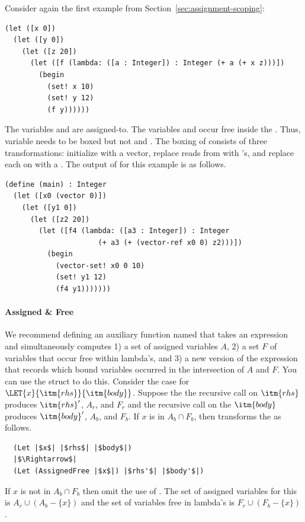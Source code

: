 \documentclass[7x10]{TimesAPriori_MIT}%
\begin{document}
Consider again the first example from
Section~\ref{sec:assignment-scoping}:
\begin{lstlisting}
(let ([x 0])
  (let ([y 0])
    (let ([z 20])
      (let ([f (lambda: ([a : Integer]) : Integer (+ a (+ x z)))])
        (begin
          (set! x 10)
          (set! y 12)
          (f y))))))
\end{lstlisting}
The variables  and  are assigned-to.  The variables
 and  occur free inside the . Thus,
variable  needs to be boxed but not  and .
The boxing of  consists of three transformations: initialize
 with a vector, replace reads from  with
's, and replace each  on  with a
. The output of  for this
example is as follows.
\begin{lstlisting}
(define (main) : Integer
  (let ([x0 (vector 0)])
    (let ([y1 0])
      (let ([z2 20])
        (let ([f4 (lambda: ([a3 : Integer]) : Integer
                      (+ a3 (+ (vector-ref x0 0) z2)))])
          (begin 
            (vector-set! x0 0 10)
            (set! y1 12)
            (f4 y1)))))))
\end{lstlisting}

\paragraph{Assigned \& Free}

We recommend defining an auxiliary function named
 that takes an expression and simultaneously
computes 1) a set of assigned variables $A$, 2) a set $F$ of variables
that occur free within lambda's, and 3) a new version of the
expression that records which bound variables occurred in the
intersection of $A$ and $F$. You can use the struct
 to do this. Consider the case for
$\LET{x}{\itm{rhs}}{\itm{body}}$.  Suppose the the recursive call on
$\itm{rhs}$ produces $\itm{rhs}'$, $A_r$, and $F_r$ and the recursive
call on the $\itm{body}$ produces $\itm{body}'$, $A_b$, and $F_b$. If
$x$ is in $A_b\cap F_b$, then transforms the  as follows.
\begin{lstlisting}
  (Let |$x$| |$rhs$| |$body$|)
  |$\Rightarrow$|
  (Let (AssignedFree |$x$|) |$rhs'$| |$body'$|)
\end{lstlisting}
If $x$ is not in $A_b\cap F_b$ then omit the use of .
The set of assigned variables for this  is
$A_r \cup (A_b - \{x\})$
and the set of variables free in lambda's is
$F_r \cup (F_b - \{x\})$.
\end{document}
